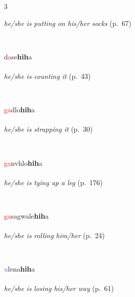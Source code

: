 \documentclass[oneside,openany]{book}%
\begin{document}
\begin{multicols}{3}
\begin{minipage}[t]{\linewidth}
\noindent \textit{he/she is putting on his/her socks} (p.~67)
\end{minipage}\\[1em]%
\begin{minipage}[t]{\linewidth}
\raggedright\noindent d\textcolor{Red}{a}se\textbf{hih}a\\
\\
\noindent \textit{he/she is counting it} (p.~43)
\end{minipage}\\[1em]%
\begin{minipage}[t]{\linewidth}
\raggedright\noindent \textcolor{Red}{ga}dlo\textbf{hih}a\\
\\
\noindent \textit{he/she is strapping it} (p.~30)
\end{minipage}\\[1em]%
\begin{minipage}[t]{\linewidth}
\raggedright\noindent \textcolor{Red}{ga}nvhlo\textbf{hih}a\\
\\
\noindent \textit{he/she is tying up a leg} (p.~176)
\end{minipage}\\[1em]%
\begin{minipage}[t]{\linewidth}
\raggedright\noindent \textcolor{Red}{ga}sagwale\textbf{hih}a\\
\\
\noindent \textit{he/she is rolling him/her} (p.~24)
\end{minipage}\\[1em]%
\begin{minipage}[t]{\linewidth}
\raggedright\noindent \textcolor{RoyalBlue}{u}lena\textbf{hih}a\\
\\
\noindent \textit{he/she is losing his/her way} (p.~61)
\end{minipage}\\[1em]%
\end{multicols}%
\vspace{1em}%
\needspace{1.5in}%
\end{document}
